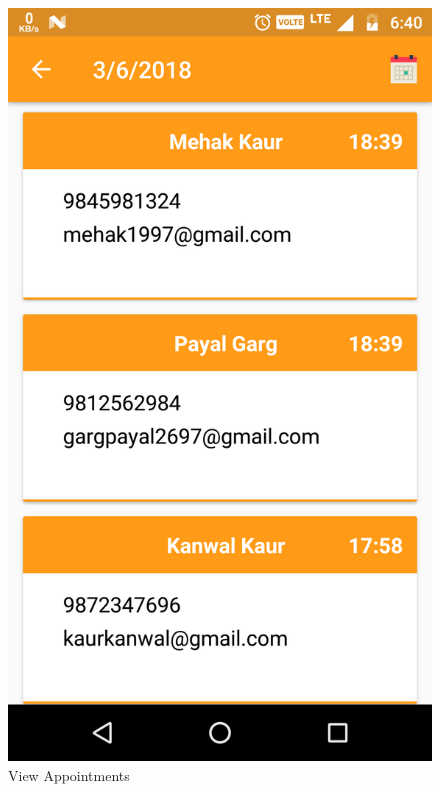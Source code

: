 \\
\begin{figure}[h]
	\centering
	\includegraphics[width=0.7\linewidth]{ViewAppointments}
	\caption{View Appointments}
\end{figure}
\pagebreak

